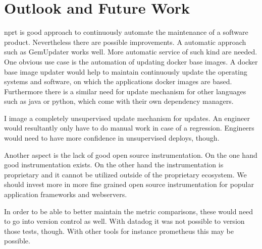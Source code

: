 \section{Outlook and Future Work}

\gls{nprt} is good approach to continuously automate the maintenance of a software
product. Nevertheless there are possible improvements. A automatic approach such as
GemUpdater works well. More automatic service of such kind are needed. One obvious use
case is the automation of updating docker base images. A docker base image updater would
help to maintain continuously update the operating systems and software, on which the
applications docker images are based. Furthermore there is a similar need for update
mechanism for other languages such as java or python, which come with their own dependency
managers.

I image a completely unsupervised update mechanism for updates. An engineer would
resultantly only have to do manual work in case of a regression. Engineers would need to
have more confidence in unsupervised deploys, though.

Another aspect is the lack of good open source instrumentation. On the one hand good
instrumentation exists. On the other hand the instrumentation is proprietary and it cannot
be utilized outside of the proprietary ecosystem. We should invest more in more fine
grained open source instrumentation for popular application frameworks and webservers.

In order to be able to better maintain the metric comparisons, these would need to go into
version control as well. With datadog it was not possible to version those tests,
though. With other tools for instance prometheus this may be possible.

